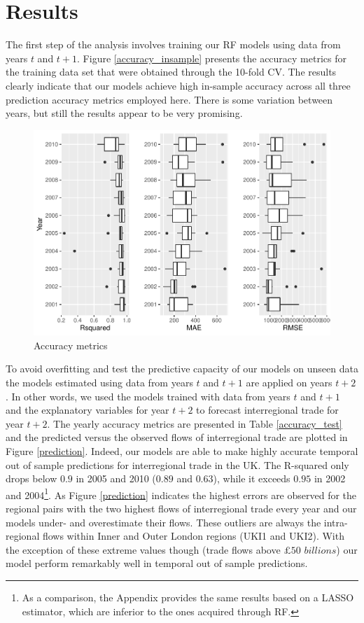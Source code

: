 \documentclass[]{interact}
\theoremstyle{plain}%
\theoremstyle{definition}
\theoremstyle{remark}
\begin{document}
\hypertarget{sec:5}{%
\section{Results}\label{sec:5}}

The first step of the analysis involves training our RF models using
data from years \(t\) and \(t + 1\). Figure \ref{accuracy_insample}
presents the accuracy metrics for the training data set that were
obtained through the 10-fold CV. The results clearly indicate that our
models achieve high in-sample accuracy across all three prediction
accuracy metrics employed here. There is some variation between years,
but still the results appear to be very promising.

\begin{figure}[p]
\includegraphics[width=1\linewidth]{hl_v2_files/figure-latex/unnamed-chunk-3-1} \caption{\label{accuracy_insample}Accuracy metrics}\label{fig:unnamed-chunk-3}
\end{figure}

To avoid overfitting and test the predictive capacity of our models on
unseen data the models estimated using data from years \(t\) and
\(t + 1\) are applied on years \(t + 2\). In other words, we used the
models trained with data from years \(t\) and \(t + 1\) and the
explanatory variables for year \(t + 2\) to forecast interregional trade
for year \(t + 2\). The yearly accuracy metrics are presented in Table
\ref{accuracy_test} and the predicted versus the observed flows of
interregional trade are plotted in Figure \ref{prediction}. Indeed, our
models are able to make highly accurate temporal out of sample
predictions for interregional trade in the UK. The R-squared only drops
below \(0.9\) in 2005 and 2010 (\(0.89\) and \(0.63\)), while it exceeds
\(0.95\) in 2002 and 2004\footnote{As a comparison, the Appendix
  provides the same results based on a LASSO estimator, which are
  inferior to the ones acquired through RF.}. As Figure \ref{prediction}
indicates the highest errors are observed for the regional pairs with
the two highest flows of interregional trade every year and our models
under- and overestimate their flows. These outliers are always the
intra-regional flows within Inner and Outer London regions (UKI1 and
UKI2). With the exception of these extreme values though (trade flows
above \(\pounds 50\) \(billions\)) our model perform remarkably well in
temporal out of sample predictions.
\end{document}
